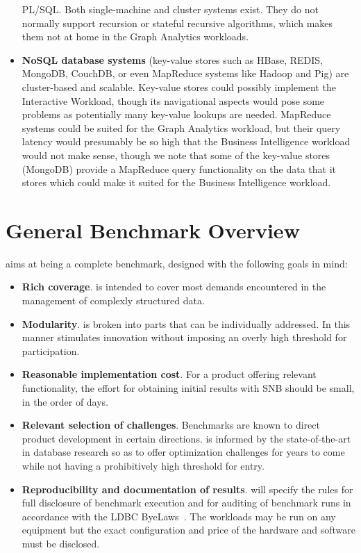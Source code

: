 \begin{itemize}
     PL/SQL. Both single-machine and cluster systems exist. They do not
     normally support recursion or stateful recursive algorithms, which makes     them not at home in the Graph Analytics workloads.
 \item \textbf{NoSQL database systems} (\eg key-value stores such as HBase,
     REDIS, MongoDB, CouchDB, or even MapReduce systems like Hadoop and Pig)
     are cluster-based and scalable. Key-value stores could possibly implement
     the Interactive Workload, though its navigational aspects would pose some
     problems as potentially many key-value lookups are needed. MapReduce
     systems could be suited for the Graph Analytics workload, but their query
     latency would presumably be so high that the Business Intelligence
     workload would not make sense, though we note that some of the key-value
     stores (\eg MongoDB) provide a MapReduce query functionality on the data
     that it stores which could make it suited for the Business Intelligence workload.
\end{itemize}


\section{General Benchmark Overview}

\ldbcsnb aims at being a complete benchmark, designed with the following goals in mind:

\begin{itemize}
 \item \textbf{Rich coverage}. \ldbcsnb is intended to cover most demands
     encountered in the management of complexly structured data.
 \item \textbf{Modularity}. \ldbcsnb is broken into parts that can be
     individually addressed. In this manner \ldbcsnb
     stimulates innovation without imposing an overly high threshold for
     participation.
 \item \textbf{Reasonable implementation cost}. For a product offering relevant
     functionality, the effort for obtaining initial results with SNB should be
     small, in the order of days.
 \item \textbf{Relevant selection of challenges}. Benchmarks are known to
     direct product development in certain directions. \ldbcsnb is informed by
     the state-of-the-art in database research so as to offer optimization
     challenges for years to come while not having a prohibitively high
     threshold for entry.
 \item \textbf{Reproducibility and documentation of results}. \ldbcsnb
     will specify the rules for full disclosure of benchmark execution and for
     auditing of benchmark runs in accordance with the LDBC ByeLaws~\cite{ldbc_byelaws}.
     The workloads may be run on any equipment
     but the exact configuration and price of the hardware and software must be
     disclosed.
\end{itemize}

